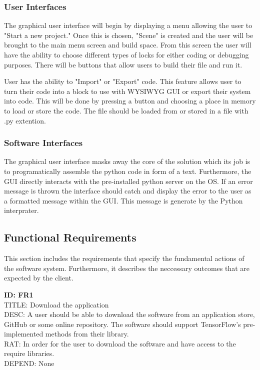 \documentclass[journal,10pt,onecolumn,compsoc]{IEEEtran} \usepackage[margin=1.0in]{geometry} \usepackage{pdfpages} \usepackage{graphicx}
\begin{document}
\subsubsection{User Interfaces}

The graphical user interface will begin by displaying a menu allowing the user to "Start a new project."
Once this is chosen, "Scene" is created and the user will be brought to the main menu screen and build space.
From this screen the user will have the ability to choose different types of locks for either coding or debugging purposes.
There will be buttons that allow users to build their file and run it.

User has the ability to "Import" or "Export" code.
This feature allows user to turn their code into a block to use with WYSIWYG GUI or export their system into code.
This will be done by pressing a button and choosing a place in memory to load or store the code. 
The file should be loaded from or stored in a file with .py extention.

\subsubsection{Software Interfaces}

The graphical user interface masks away the core of the solution which its job is to programatically assemble the python code in form of a text.
Furthermore, the GUI directly interacts with the pre-installed python server on the OS.
If an error message is thrown the interface should catch and display the error to the user as a formatted message within the GUI.
This message is generate by the Python interprater.

\subsection{Functional Requirements}

This section includes the requirements that specify the fundamental actions of the software system.
Furthermore, it describes the neccessary outcomes that are expected by the client.

\noindent
\textbf{ID: FR1}\\
TITLE: Download the application\\
DESC: A user should be able to download the software from an application store, GitHub or some online repository. 
The software should support TensorFlow's pre-implemented methods from their library. \\
RAT: In order for the user to download the software and have access to the require libraries.\\
DEPEND: None\\
\end{document}
